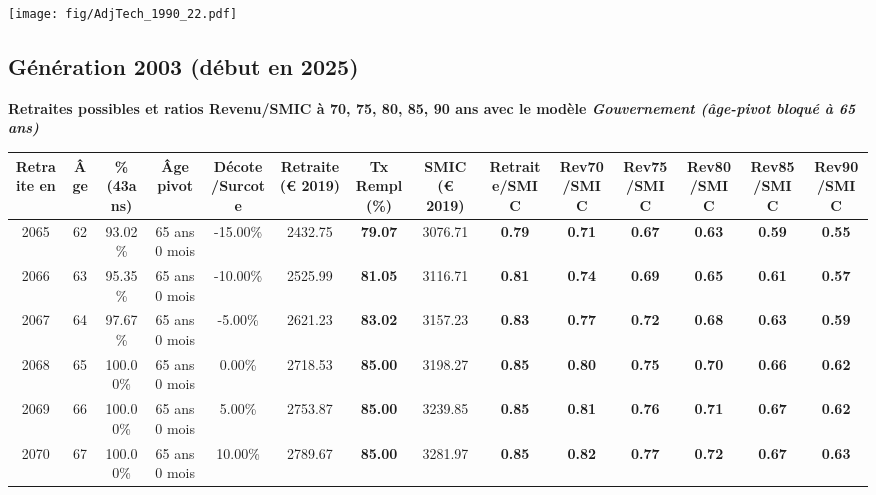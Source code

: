  \vspace{0.1cm} 

 \begin{center}\texttt{[image: fig/AdjTech\_1990\_22.pdf]}\end{center} \label{fig/AdjTech_1990_22.pdf} 

\newpage 
 
\subsection{Génération 2003 (début en 2025)} 

{\bf \noindent Retraites possibles et ratios Revenu/SMIC à 70, 75, 80, 85, 90 ans avec le modèle \emph{Gouvernement (âge-pivot bloqué à 65 ans)}}  
 
\begin{adjustbox}{max width=\textwidth} 
\begin{tabular}[htb]{|c|c||c|c|c||c|c||c||c|c|c|c|c|c|} 
\hline 
 Retraite en &  Âge &  \%(43ans) &  Âge pivot &  Décote/Surcote &  Retraite (\euro{} 2019) &  Tx Rempl(\%) &  SMIC (\euro{} 2019) &  Retraite/SMIC &  Rev70/SMIC &  Rev75/SMIC &  Rev80/SMIC &  Rev85/SMIC &  Rev90/SMIC \\ 
\hline \hline 
 2065 &  62 &  93.02\% &  65 ans 0 mois &  -15.00\% &  2432.75 &  {\bf 79.07} &  3076.71 &  {\bf {\color{red} 0.79}} &  {\bf {\color{red} 0.71}} &  {\bf {\color{red} 0.67}} &  {\bf {\color{red} 0.63}} &  {\bf {\color{red} 0.59}} &  {\bf {\color{red} 0.55}} \\ 
\hline 
 2066 &  63 &  95.35\% &  65 ans 0 mois &  -10.00\% &  2525.99 &  {\bf 81.05} &  3116.71 &  {\bf {\color{red} 0.81}} &  {\bf {\color{red} 0.74}} &  {\bf {\color{red} 0.69}} &  {\bf {\color{red} 0.65}} &  {\bf {\color{red} 0.61}} &  {\bf {\color{red} 0.57}} \\ 
\hline 
 2067 &  64 &  97.67\% &  65 ans 0 mois &  -5.00\% &  2621.23 &  {\bf 83.02} &  3157.23 &  {\bf {\color{red} 0.83}} &  {\bf {\color{red} 0.77}} &  {\bf {\color{red} 0.72}} &  {\bf {\color{red} 0.68}} &  {\bf {\color{red} 0.63}} &  {\bf {\color{red} 0.59}} \\ 
\hline 
 2068 &  65 &  100.00\% &  65 ans 0 mois &  0.00\% &  2718.53 &  {\bf 85.00} &  3198.27 &  {\bf {\color{red} 0.85}} &  {\bf {\color{red} 0.80}} &  {\bf {\color{red} 0.75}} &  {\bf {\color{red} 0.70}} &  {\bf {\color{red} 0.66}} &  {\bf {\color{red} 0.62}} \\ 
\hline 
 2069 &  66 &  100.00\% &  65 ans 0 mois &  5.00\% &  2753.87 &  {\bf 85.00} &  3239.85 &  {\bf {\color{red} 0.85}} &  {\bf {\color{red} 0.81}} &  {\bf {\color{red} 0.76}} &  {\bf {\color{red} 0.71}} &  {\bf {\color{red} 0.67}} &  {\bf {\color{red} 0.62}} \\ 
\hline 
 2070 &  67 &  100.00\% &  65 ans 0 mois &  10.00\% &  2789.67 &  {\bf 85.00} &  3281.97 &  {\bf {\color{red} 0.85}} &  {\bf {\color{red} 0.82}} &  {\bf {\color{red} 0.77}} &  {\bf {\color{red} 0.72}} &  {\bf {\color{red} 0.67}} &  {\bf {\color{red} 0.63}} \\ 
\hline 
\hline 
\end{tabular} 
\end{adjustbox} 
 
